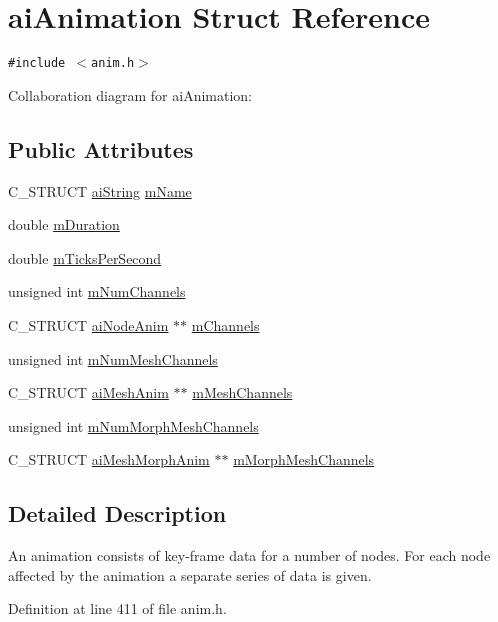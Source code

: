 \hypertarget{structai_animation}{
\section{aiAnimation Struct Reference}
\label{structai_animation}
}
{\tt \#include $<$anim.h$>$}

Collaboration diagram for aiAnimation:\subsection*{Public Attributes}
\begin{CompactItemize}
\item 
C\_\-STRUCT \hyperlink{structai_string}{aiString} \hyperlink{structai_animation_1be7d78d88694173a7ceef658fea77f1}{mName}
\item 
double \hyperlink{structai_animation_e2bbc49320b4b75c05e23e0ab704ece7}{mDuration}
\item 
double \hyperlink{structai_animation_fd26a40c3f16b6aa6e150effa3eaeab1}{mTicksPerSecond}
\item 
unsigned int \hyperlink{structai_animation_ebfccf9a9aefa6084566d21e8a30b7e5}{mNumChannels}
\item 
C\_\-STRUCT \hyperlink{structai_node_anim}{aiNodeAnim} $\ast$$\ast$ \hyperlink{structai_animation_89244bb68b725ffbb85137174c28e757}{mChannels}
\item 
unsigned int \hyperlink{structai_animation_c43aacd8502020174e553501f0b6bf5f}{mNumMeshChannels}
\item 
C\_\-STRUCT \hyperlink{structai_mesh_anim}{aiMeshAnim} $\ast$$\ast$ \hyperlink{structai_animation_f05138121dbde8b31aa031505b454c85}{mMeshChannels}
\item 
unsigned int \hyperlink{structai_animation_ed9aa50bdf38c9f6064f79f5aab38d59}{mNumMorphMeshChannels}
\item 
C\_\-STRUCT \hyperlink{structai_mesh_morph_anim}{aiMeshMorphAnim} $\ast$$\ast$ \hyperlink{structai_animation_bcc055a00bed8ce3329fdf4a9c22ec9c}{mMorphMeshChannels}
\end{CompactItemize}


\subsection{Detailed Description}
An animation consists of key-frame data for a number of nodes. For each node affected by the animation a separate series of data is given. 

Definition at line 411 of file anim.h.

